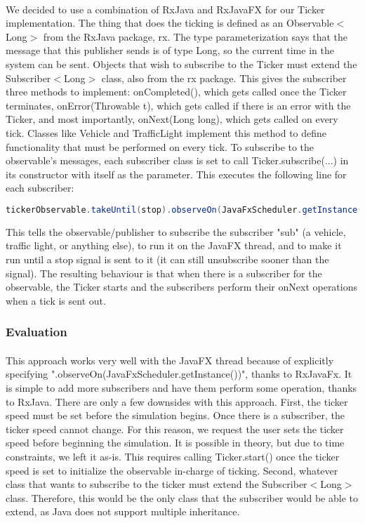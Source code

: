 \documentclass[a4paper,11pt,titlepage]{article}
\begin{document}
\paragraph{}
We decided to use a combination of RxJava and RxJavaFX for our Ticker implementation. The thing that does the ticking is defined as an Observable$<$Long$>$ from the RxJava package, rx. The type parameterization says that the message that this publisher sends is of type Long, so the current time in the system can be sent. Objects that wish to subscribe to the Ticker must extend the Subscriber$<$Long$>$ class, also from the rx package. This gives the subscriber three methods to implement: onCompleted(), which gets called once the Ticker terminates, onError(Throwable t), which gets called if there is an error with the Ticker, and most importantly, onNext(Long long), which gets called on every tick. Classes like Vehicle and TrafficLight implement this method to define functionality that must be performed on every tick. To subscribe to the observable's messages, each subscriber class is set to call Ticker.subscribe(...) in its constructor with itself as the parameter. This executes the following line for each subscriber:
\begin{lstlisting}[language=Java,breaklines=true,basicstyle=\small]
tickerObservable.takeUntil(stop).observeOn(JavaFxScheduler.getInstance()).subscribe(sub);
\end{lstlisting}
This tells the observable/publisher to subscribe the subscriber "sub" (a vehicle, traffic light, or anything else), to run it on the JavaFX thread, and to make it run until a stop signal is sent to it (it can still unsubscribe sooner than the signal). The resulting behaviour is that when there is a subscriber for the observable, the Ticker starts and the subscribers perform their onNext operations when a tick is sent out.

\subsubsection{Evaluation}
\paragraph{}
This approach works very well with the JavaFX thread because of explicitly specifying ".observeOn(JavaFxScheduler.getInstance())", thanks to RxJavaFx. It is simple to add more subscribers and have them perform some operation, thanks to RxJava. There are only a few downsides with this approach. First, the ticker speed must be set before the simulation begins. Once there is a subscriber, the ticker speed cannot change. For this reason, we request the user sets the ticker speed before beginning the simulation. It is possible in theory, but due to time constraints, we left it as-is. This requires calling Ticker.start() once the ticker speed is set to initialize the observable in-charge of ticking. Second, whatever class that wants to subscribe to the ticker must extend the Subscriber$<$Long$>$ class. Therefore, this would be the only class that the subscriber would be able to extend, as Java does not support multiple inheritance.
\end{document}

